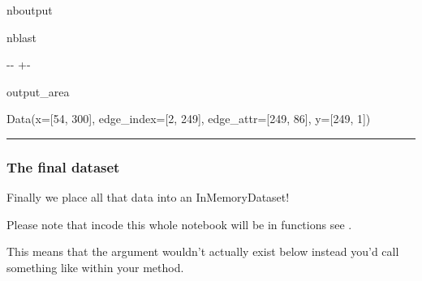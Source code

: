 \documentclass[letterpaper,10pt,english]{sphinxhowto}
\begin{document}
\begin{sphinxuseclass}{nboutput}
\begin{sphinxuseclass}{nblast}
{

\kern-\sphinxverbatimsmallskipamount\kern-\baselineskip
\kern+\FrameHeightAdjust\kern-\fboxrule
\vspace{\nbsphinxcodecellspacing}

\begin{sphinxuseclass}{output_area}
\begin{sphinxuseclass}{}


\begin{sphinxVerbatim}[commandchars=\\\{\}]
\llap{\color{nbsphinxout}[10]:\,\hspace{\fboxrule}\hspace{\fboxsep}}Data(x=[54, 300], edge\_index=[2, 249], edge\_attr=[249, 86], y=[249, 1])
\end{sphinxVerbatim}



\end{sphinxuseclass}
\end{sphinxuseclass}
}

\end{sphinxuseclass}
\end{sphinxuseclass}

\bigskip\hrule\bigskip



\subsubsection{The final dataset}
\label{\detokenize{reddit-dataset-example:The-final-dataset}}
\sphinxAtStartPar
Finally we place all that data into an InMemoryDataset!

\sphinxAtStartPar
Please note that in\sphinxhyphen{}code this whole notebook will be in functions \sphinxhyphen{} see .

\sphinxAtStartPar
This means that the  argument wouldn’t actually exist below \sphinxhyphen{} instead you’d call something like  within your  method.
\end{document}
